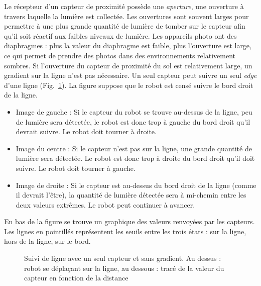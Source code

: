 Le récepteur d'un capteur de proximité possède une \emph{aperture}, une ouverture à travers laquelle la lumière est collectée. Les ouvertures sont souvent larges pour permettre à une plus grande quantité de lumière de tomber sur le capteur afin qu'il soit réactif aux faibles niveaux de lumière. Les appareils photo ont des diaphragmes : plus la valeur du diaphragme est faible, plus l'ouverture est large, ce qui permet de prendre des photos dans des environnements relativement sombres. Si l'ouverture du capteur de proximité du sol est relativement large, un gradient sur la ligne n'est pas nécessaire. Un seul capteur peut suivre un seul \emph{edge} d'une ligne (Fig.~\ref{fig.no-gradient}). La figure suppose que le robot est censé suivre le bord droit de la ligne.
\begin{itemize}
\item Image de gauche : Si le capteur du robot se trouve au-dessus de la ligne, peu de lumière sera détectée, le robot est donc trop à gauche du bord droit qu'il devrait suivre. Le robot doit tourner à droite.
\item Image du centre : Si le capteur n'est pas sur la ligne, une grande quantité de lumière sera détectée. Le robot est donc trop à droite du bord droit qu'il doit suivre. Le robot doit tourner à gauche.
\item Image de droite : Si le capteur est au-dessus du bord droit de la ligne (comme il devrait l'être), la quantité de lumière détectée sera à mi-chemin entre les deux valeurs extrêmes. Le robot peut continuer à avancer.
\end{itemize}
En bas de la figure se trouve un graphique des valeurs renvoyées par les capteurs. Les lignes en pointillés représentent les seuils entre les trois états : sur la ligne, hors de la ligne, sur le bord.

\begin{figure}
\begin{center}
\caption{Suivi de ligne avec un seul capteur et sans gradient. Au dessus : robot se déplaçant sur la ligne, au dessous : tracé de la valeur du capteur en fonction de la distance}\label{fig.no-gradient}
\end{center}
\end{figure}


